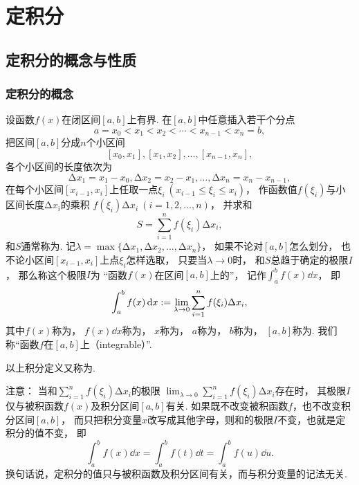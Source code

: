 \chapter{定积分}
\section{定积分的概念与性质}
\subsection{定积分的概念}
\begin{definition}
设函数\(f(x)\)在闭区间\([a,b]\)上有界.
在\([a,b]\)中任意插入若干个分点\[
	a=x_0 < x_1 < x_2 < \dotsb < x_{n-1} < x_n = b,
\]
把区间\([a,b]\)分成\(n\)个小区间\[
	[x_0,x_1],[x_1,x_2],\dotsc,[x_{n-1},x_n],
\]
各个小区间的长度依次为\[
	\increment x_1=x_1-x_0,
	\increment x_2=x_2-x_1,
	\dotsc,
	\increment x_n=x_n-x_{n-1},
\]
在每个小区间\([x_{i-1},x_i]\)上任取一点\(\xi_i\ (x_{i-1} \leq \xi_i \leq x_i)\)，
作函数值\(f(\xi_i)\)与小区间长度\(\increment x_i\)的乘积
\(f(\xi_i)\increment x_i\ (i=1,2,\dotsc,n)\)，
并求和\[
	S = \sum_{i=1}^n f(\xi_i) \increment x_i,
\]
和\(S\)通常称为.
记\(\lambda=\max\{\increment x_1,\increment x_2,\dotsc,\increment x_n\}\)，
如果不论对\([a,b]\)怎么划分，
也不论小区间\([x_{i-1},x_i]\)上点\(\xi_i\)怎样选取，
只要当\(\lambda\to0\)时，
和\(S\)总趋于确定的极限\(I\)，
那么称这个极限\(I\)为
“函数\(f(x)\)在区间\([a,b]\)上的”，
记作\(\int_a^b f(x) \dd{x}\)，
即\begin{equation}
	\int_a^b f(x) \dd{x}
	:=
	\lim_{\lambda\to0} \sum_{i=1}^n f(\xi_i)\Delta x_i,
\end{equation}
其中\(f(x)\)称为，
\(f(x)\dd{x}\)称为，
\(x\)称为，
\(a\)称为，
\(b\)称为，
\([a,b]\)称为.
我们称“函数\(f\)在\([a,b]\)上（integrable）”.
\end{definition}
以上积分定义又称为.

注意：
当和\(\sum_{i=1}^n f(\xi_i) \increment x_i\)的极限
\(\lim_{\lambda\to0} \sum_{i=1}^n f(\xi_i) \increment x_i\)存在时，
其极限\(I\)仅与被积函数\(f(x)\)及积分区间\([a,b]\)有关.
如果既不改变被积函数\(f\)，也不改变积分区间\([a,b]\)，
而只把积分变量\(x\)改写成其他字母，则和的极限\(I\)不变，也就是定积分的值不变，
即\[
	\int_a^b f(x) \dd{x}
	= \int_a^b f(t) \dd{t}
	= \int_a^b f(u) \dd{u}.
\]
换句话说，定积分的值只与被积函数及积分区间有关，而与积分变量的记法无关.

